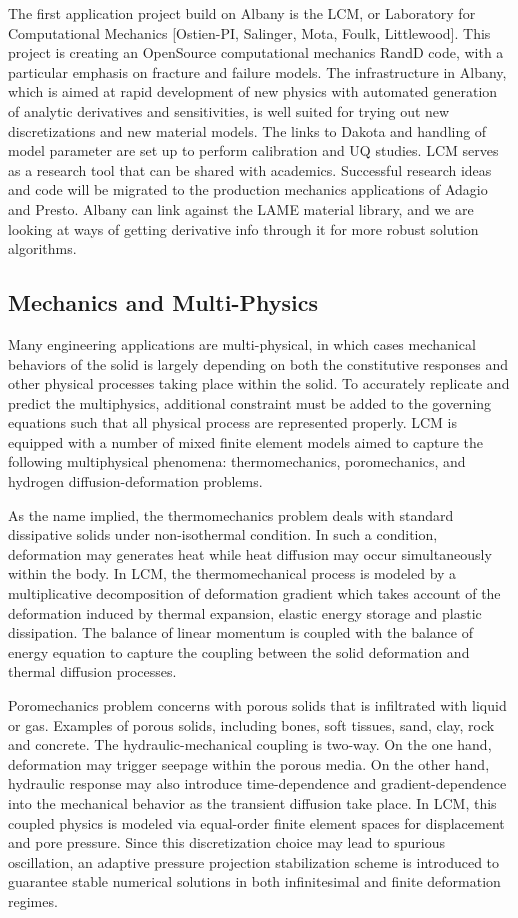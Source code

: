 \documentclass[pdf,12pt,report,strict]{SANDreport}
\theoremstyle{remark}
\begin{document}
The first application project build on Albany is the LCM, or
Laboratory for Computational Mechanics [Ostien-PI, Salinger, Mota,
  Foulk, Littlewood]. This project is creating an OpenSource
computational mechanics RandD code, with a particular emphasis on
fracture and failure models. The infrastructure in Albany, which is
aimed at rapid development of new physics with automated generation of
analytic derivatives and sensitivities, is well suited for trying out
new discretizations and new material models. The links to Dakota and
handling of model parameter are set up to perform calibration and UQ
studies. LCM serves as a research tool that can be shared with
academics. Successful research ideas and code will be migrated to the
production mechanics applications of Adagio and Presto. Albany can
link against the LAME material library, and we are looking at ways of
getting derivative info through it for more robust solution
algorithms.  


\subsection{Mechanics and Multi-Physics}
Many engineering applications are multi-physical, in which cases 
mechanical behaviors  of the solid is largely depending on both 
the constitutive responses and other physical processes taking 
place within the solid. To accurately replicate and predict the multiphysics, 
additional constraint must be added to the governing equations such that
all physical process are represented properly. 
LCM is equipped with a number of mixed finite element models aimed to capture
the following multiphysical phenomena: thermomechanics, poromechanics, and hydrogen diffusion-deformation problems. 

As the name implied, the thermomechanics problem deals with standard dissipative
 solids under non-isothermal condition. In such a condition, deformation may
  generates heat while heat diffusion may occur simultaneously within the body. 
In LCM, the thermomechanical process is modeled by a multiplicative decomposition 
of deformation gradient which takes account of the deformation induced by thermal
 expansion, elastic energy storage and plastic dissipation. The balance of 
linear momentum is coupled with the balance of energy equation to capture the
 coupling between the solid deformation and thermal diffusion processes. 

Poromechanics problem concerns with porous solids that is infiltrated with 
liquid or gas. Examples of porous solids, including bones, soft tissues, sand, clay, 
rock and concrete. The hydraulic-mechanical coupling is two-way. On the one hand,
 deformation may trigger seepage within the porous media. On the other hand,  hydraulic response may also introduce time-dependence and gradient-dependence into the mechanical behavior as the transient diffusion take place. In LCM, this coupled physics is modeled via equal-order finite element spaces for displacement and pore pressure. Since this discretization choice may lead to spurious oscillation, an adaptive pressure projection stabilization scheme is introduced to guarantee stable numerical solutions in both infinitesimal and finite deformation regimes. 
 
\end{document}

